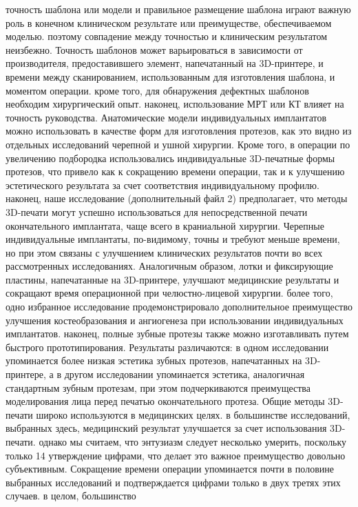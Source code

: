 точность шаблона или модели и правильное размещение шаблона играют важную роль в
конечном клиническом результате или преимуществе, обеспечиваемом моделью.
поэтому совпадение между точностью и клиническим результатом неизбежно. Точность
шаблонов может варьироваться в зависимости от производителя, предоставившего
элемент, напечатанный на 3D-принтере, и времени между сканированием,
использованным для изготовления шаблона, и моментом операции. кроме того, для
обнаружения дефектных шаблонов необходим хирургический опыт. наконец,
использование МРТ или КТ влияет на точность руководства. Анатомические модели
индивидуальных имплантатов можно использовать в качестве форм для изготовления
протезов, как это видно из отдельных исследований черепной и ушной хирургии.
Кроме того, в операции по увеличению подбородка использовались индивидуальные
3D-печатные формы протезов, что привело как к сокращению времени операции, так и
к улучшению эстетического результата за счет соответствия индивидуальному
профилю. наконец, наше исследование (дополнительный файл 2) предполагает, что
методы 3D-печати могут успешно использоваться для непосредственной печати
окончательного имплантата, чаще всего в краниальной хирургии. Черепные
индивидуальные имплантаты, по-видимому, точны и требуют меньше времени, но при
этом связаны с улучшением клинических результатов почти во всех рассмотренных
исследованиях. Аналогичным образом, лотки и фиксирующие пластины, напечатанные
на 3D-принтере, улучшают медицинские результаты и сокращают время операционной
при челюстно-лицевой хирургии. более того, одно избранное исследование
продемонстрировало дополнительное преимущество улучшения костеобразования и
ангиогенеза при использовании индивидуальных имплантатов. наконец, полные зубные
протезы также можно изготавливать путем быстрого прототипирования. Результаты
различаются: в одном исследовании упоминается более низкая эстетика зубных
протезов, напечатанных на 3D-принтере, а в другом исследовании упоминается
эстетика, аналогичная стандартным зубным протезам, при этом подчеркиваются
преимущества моделирования лица перед печатью окончательного протеза. Общие
методы 3D-печати широко используются в медицинских целях. в большинстве
исследований, выбранных здесь, медицинский результат улучшается за счет
использования 3D-печати. однако мы считаем, что энтузиазм следует несколько
умерить, поскольку только 14 %
утверждение цифрами, что делает это важное преимущество довольно субъективным.
Сокращение времени операции упоминается почти в половине выбранных исследований
и подтверждается цифрами только в двух третях этих случаев. в целом, большинство
